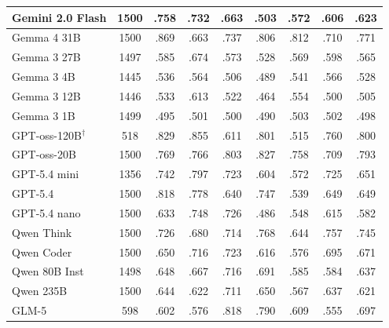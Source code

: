 \begin{table}[!htbp]
\begin{tabular}{lcccccccc}
Gemini 2.0 Flash & 1500 & .758 & .732 & .663 & .503 & .572 & .606 & .623 \\
\midrule
Gemma 4 31B & 1500 & .869 & .663 & .737 & .806 & .812 & .710 & .771 \\
Gemma 3 27B & 1497 & .585 & .674 & .573 & .528 & .569 & .598 & .565 \\
Gemma 3 4B & 1445 & .536 & .564 & .506 & .489 & .541 & .566 & .528 \\
Gemma 3 12B & 1446 & .533 & .613 & .522 & .464 & .554 & .500 & .505 \\
Gemma 3 1B & 1499 & .495 & .501 & .500 & .490 & .503 & .502 & .498 \\
\midrule
GPT-oss-120B$^\dagger$ & 518 & .829 & .855 & .611 & .801 & .515 & .760 & .800 \\
GPT-oss-20B & 1500 & .769 & .766 & .803 & .827 & .758 & .709 & .793 \\
GPT-5.4 mini & 1356 & .742 & .797 & .723 & .604 & .572 & .725 & .651 \\
GPT-5.4 & 1500 & .818 & .778 & .640 & .747 & .539 & .649 & .649 \\
GPT-5.4 nano & 1500 & .633 & .748 & .726 & .486 & .548 & .615 & .582 \\
\midrule
Qwen Think & 1500 & .726 & .680 & .714 & .768 & .644 & .757 & .745 \\
Qwen Coder & 1500 & .650 & .716 & .723 & .616 & .576 & .695 & .671 \\
Qwen 80B Inst & 1498 & .648 & .667 & .716 & .691 & .585 & .584 & .637 \\
Qwen 235B & 1500 & .644 & .622 & .711 & .650 & .567 & .637 & .621 \\
\midrule
GLM-5 & 598 & .602 & .576 & .818 & .790 & .609 & .555 & .697 \\
\bottomrule
\end{tabular}
\end{table}
